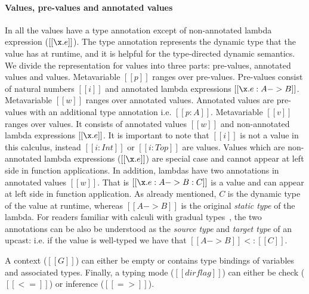 \paragraph{Values, pre-values and annotated values} In \name all the values have
a type annotation except of non-annotated lambda expression ($[[\x.e]]$).
The type annotation represents the dynamic type
that the value has at runtime, and
it is helpful for the type-directed dynamic semantics.
We divide the representation for values into three parts: pre-values,
annotated values and values.
Metavariable $[[p]]$ ranges over pre-values. Pre-values
consist of natural numbers $[[i]]$
and annotated lambda expressions $[[\x.e : A -> B]]$.
Metavariable $[[w]]$ ranges over annotated values. 
Annotated values are pre-values with an additional type annotation i.e. $[[p:A]]$.
Metavariable $[[v]]$ ranges over
values. It consists of annotated values $[[w]]$ and non-annotated 
lambda expressions $[[\x.e]]$.
It is important to note that $[[i]]$ is not a value in this
calculus, instead $[[i:Int]]$ or $[[i:Top]]$ are values.
Values which are non-annotated lambda expressions ($[[\x.e]]$) are special case
and cannot appear at left side in function applications.
In addition, lambdas have two annotations in annotated values $[[w]]$.
That is $[[\x.e : A -> B : C]]$ is a value and can appear at left side in function application.
As already mentioned, $C$ is the dynamic type of the value
at runtime, whereas $[[A -> B]]$ is the original \emph{static type} of the lambda.
For readers familiar with calculi with gradual types~\cite{}, the two annotations
can be also be understood as the \emph{source type} and \emph{target type}
of an upcast: i.e. if the value is well-typed we have that $[[A -> B]] <: [[C]]$.

A context ($[[G]]$) can
either be empty or contains type bindings of variables and associated
types. Finally, a typing mode ($[[dirflag]]$) can either be check ($[[<=]]$)
or inference ($[[=>]]$).

